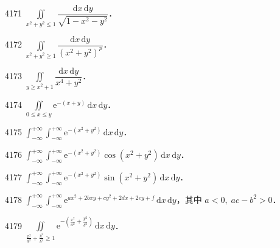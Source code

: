 \begin{prob}[S]{4171}
$\displaystyle\iint\limits_{x^2+y^2 \leqslant 1} \dfrac{\mathrm{d}x\,\mathrm{d}y}{\sqrt{1 - x^2 - y^2}}$．
\end{prob}

\begin{prob}[S]{4172}
$\displaystyle\iint\limits_{x^2+y^2 \geqslant 1} \dfrac{\mathrm{d}x\,\mathrm{d}y}{(x^2 + y^2)^p}$．
\end{prob}

\begin{prob}[S]{4173}
$\displaystyle\iint\limits_{y \geqslant x^2 + 1} \dfrac{\mathrm{d}x\,\mathrm{d}y}{x^4 + y^2}$．
\end{prob}

\begin{prob}[S]{4174}
$\displaystyle\iint\limits_{0 \leqslant x \leqslant y} \mathrm{e}^{-(x+y)} \,\mathrm{d}x\,\mathrm{d}y$．
\end{prob}


\begin{prob}[S]{4175}
$\displaystyle\int_{-\infty}^{+\infty} \int_{-\infty}^{+\infty} \mathrm{e}^{-(x^2+y^2)} \,\mathrm{d}x\,\mathrm{d}y$．
\end{prob}

\begin{prob}[S]{4176}
$\displaystyle\int_{-\infty}^{+\infty} \int_{-\infty}^{+\infty} \mathrm{e}^{-(x^2+y^2)} \cos(x^2 + y^2) \,\mathrm{d}x\,\mathrm{d}y$．
\end{prob}

\begin{prob}[S]{4177}
$\displaystyle\int_{-\infty}^{+\infty} \int_{-\infty}^{+\infty} \mathrm{e}^{-(x^2+y^2)} \sin(x^2 + y^2) \,\mathrm{d}x\,\mathrm{d}y$．
\end{prob}


\begin{prob}[S]{4178}
$\displaystyle\int_{-\infty}^{+\infty} \int_{-\infty}^{+\infty} \mathrm{e}^{ax^2 + 2bxy + cy^2 + 2dx + 2ey + f} \,\mathrm{d}x\,\mathrm{d}y$，其中 $a < 0,\; ac - b^2 > 0$．
\end{prob}

\begin{prob}[S]{4179}
$\displaystyle\iint\limits_{\frac{x^2}{a^2}+\frac{y^2}{b^2} \geqslant 1} \mathrm{e}^{-\left(\frac{x^2}{a^2}+\frac{y^2}{b^2}\right)} \,\mathrm{d}x\,\mathrm{d}y$．
\end{prob}

